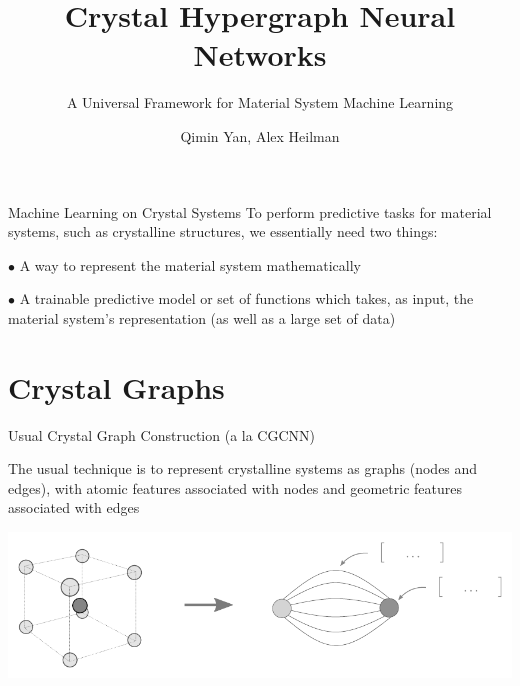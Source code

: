 \documentclass[11pt]{beamer}
\author{Qimin Yan, Alex Heilman}
\title{Crystal Hypergraph Neural Networks}
\subtitle{A Universal Framework for Material System Machine Learning}
\begin{document}
\begin{frame}
\titlepage
\end{frame}


\begin{frame}{Machine Learning on Crystal Systems}
To perform predictive tasks for material systems, such as crystalline structures, we essentially need two things:

\medskip

$\bullet$ A way to represent the material system mathematically

\medskip

$\bullet$ A trainable predictive model or set of functions which takes, as input, the material system's representation (as well as a large set of data)
\end{frame}


\section{Crystal Graphs}
\begin{frame}{Usual Crystal Graph Construction \small(a la CGCNN)}

The usual technique is to represent crystalline systems as graphs (nodes and edges), with atomic features associated with nodes and geometric features associated with edges

\medskip

\begin{center}

\includegraphics[scale=0.7]{crystalgraph.pdf}

\end{center}
\end{frame}
\end{document}
